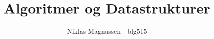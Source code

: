 \documentclass[a4paper]{article}
\title{\textbf{Algoritmer og Datastrukturer}}
\author{Niklas Magnussen - blg515}
\begin{document}
\let\oldproofname=\proofname
\renewcommand{\proofname}{\textbf{\textit{Bevis.}}}
\maketitle
\tableofcontents









\end{document}
